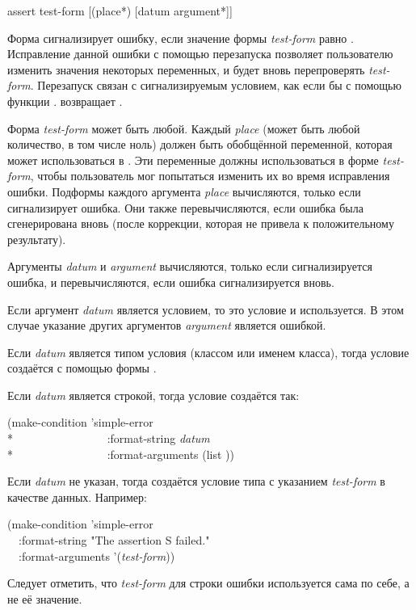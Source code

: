 \begin{defmac}
assert test-form [({place}*) [datum {argument}*]]

Форма  сигнализирует ошибку, если значение формы \emph{test-form}
равно . Исправление данной ошибки с помощью перезапуска 
позволяет пользователю изменить значения некоторых переменных, и 
будет вновь перепроверять \emph{test-form}. Перезапуск связан с сигнализируемым
условием, как если бы с помощью функции .
 возвращает .

Форма \emph{test-form} может быть любой. Каждый \emph{place} (может быть любой
количество, в том числе ноль) должен быть обобщённой переменной, которая может
использоваться в . Эти переменные должны использоваться в форме
\emph{test-form}, чтобы пользователь мог попытаться изменить их во время
исправления ошибки. Подформы каждого аргумента \emph{place} вычисляются, только
если сигнализирует ошибка. Они также перевычисляются, если ошибка была
сгенерирована вновь (после коррекции, которая не привела к положительному
результату).

Аргументы \emph{datum} и \emph{argument} вычисляются, только если
сигнализируется ошибка, и перевычисляются, если ошибка сигнализируется вновь.

Если аргумент \emph{datum} является условием, то это условие и используется. В
этом случае указание других аргументов \emph{argument} является ошибкой.

Если \emph{datum} является типом условия (классом или именем класса), тогда
условие создаётся с помощью формы .

Если \emph{datum} является строкой, тогда условие создаётся так:
\begin{lisp}
(make-condition 'simple-error \\*
~~~~~~~~~~~~~~~~:format-string \emph{datum} \\*
~~~~~~~~~~~~~~~~:format-arguments (list ))
\end{lisp}

Если \emph{datum} не указан, тогда создаётся условие типа  с
указанием \emph{test-form} в качестве данных. Например:
\begin{lisp}
(make-condition 'simple-error \\
~~:format-string "The assertion {\Xtilde}S failed." \\
~~:format-arguments '(\emph{test-form}))
\end{lisp}
Следует отметить, что \emph{test-form} для строки ошибки используется сама по
себе, а не её значение.


\end{defmac}

